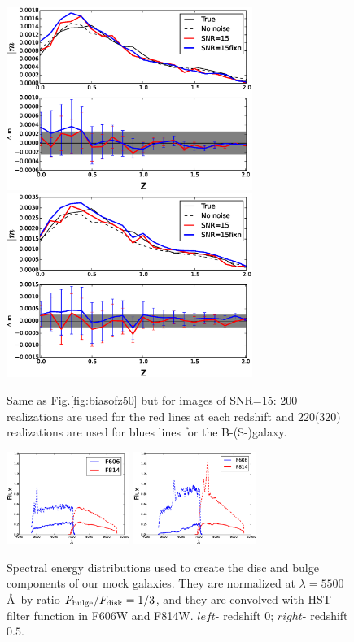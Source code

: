 \documentclass[useAMS,usenatbib]{mn2e}
\begin{document}
\begin{figure}
  \includegraphics[width=8.0cm]{zs2n_b_snrtt15.eps}
  \includegraphics[width=8.0cm]{zs2n_s_snrtt15.eps}
\caption{Same as Fig.\ref{fig:biasofz50} but for images of SNR=15:
  $200$ realizations are used for the red lines at each redshift and
  $220$($320$) realizations are used for blues lines for the
  B-(S-)galaxy. }
\label{fig:biasofz15}
\end{figure}

%
\begin{figure}
\centerline{\includegraphics[width=4.0cm]{z0bandsed.eps}
\includegraphics[width=4.0cm]{z5bandsed.eps}}
\caption{Spectral energy distributions used to create the disc and
  bulge components of our mock galaxies. They are normalized at
  $\lambda=5500$\AA$\,$ by ratio $F_{\rm bulge}/F_{\rm disk}=1/3$, and they
  are convolved with HST filter function in F606W and F814W. $left$-
  redshift $0$; $right$- redshift $0.5$.}
\label{fig:sedz}
\end{figure}
\end{document}
